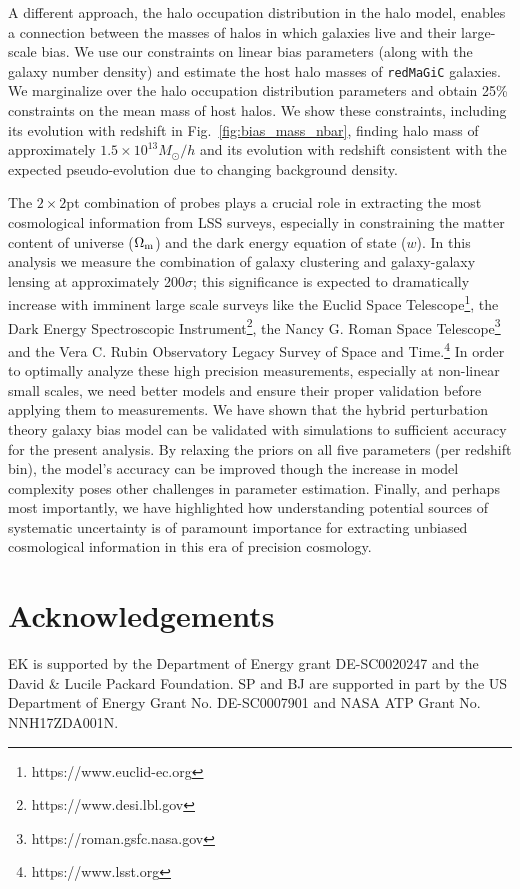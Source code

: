 \documentclass[aps, prd,twocolumn,superscriptaddress,nofootinbib,preprintnumbers]{revtex4-1}
\newcommand{\redmagic}{\texttt{redMaGiC} }
\begin{document}
A different approach, the halo occupation distribution in the halo model, enables a connection between the masses of halos in which galaxies live and their large-scale bias. We use our constraints on linear bias parameters (along with the galaxy number density) and estimate the host halo masses of \redmagic galaxies. We marginalize over the halo occupation distribution parameters and obtain 25\% constraints on the mean mass of host halos. We show these constraints, including its evolution with redshift in Fig.~\ref{fig:bias_mass_nbar}, finding halo mass of approximately $1.5 \times 10^{13} M_{\odot}/h$ and its evolution with redshift consistent with the expected pseudo-evolution due to changing background density. 




The $2\times2$pt combination of probes plays a crucial role in extracting the most cosmological information from LSS surveys, especially in constraining the matter content of universe ($\Omega_{\rm m}$) and the dark energy equation of state ($w$). In this analysis we measure the combination of galaxy clustering and galaxy-galaxy lensing  at approximately 200$\sigma$; this significance  is expected to dramatically increase with imminent large scale surveys like the Euclid Space Telescope\footnote{https://www.euclid-ec.org}, the Dark Energy Spectroscopic Instrument\footnote{https://www.desi.lbl.gov}, the Nancy G. Roman Space Telescope\footnote{https://roman.gsfc.nasa.gov} and the Vera C. Rubin Observatory Legacy Survey of Space and Time.\footnote{https://www.lsst.org} In order to optimally analyze these high precision measurements, especially at non-linear small scales, we need better models and ensure their proper validation before applying them to measurements. We have shown that the  hybrid perturbation theory galaxy bias model can be validated with simulations to sufficient accuracy for the present analysis. By relaxing the priors on all five parameters (per redshift bin), the model's accuracy can be improved though the increase in model complexity poses other challenges in parameter estimation. Finally, and perhaps most importantly, we have highlighted how understanding   potential sources of systematic uncertainty is of paramount importance for extracting  unbiased cosmological information in this era of precision cosmology. 


\section*{Acknowledgements}
EK is supported by the Department of Energy grant DE-SC0020247 and the David \& Lucile Packard Foundation.
SP and BJ are supported in part by the US Department of Energy Grant No. DE-SC0007901 and NASA ATP Grant No. NNH17ZDA001N. 
\end{document}
